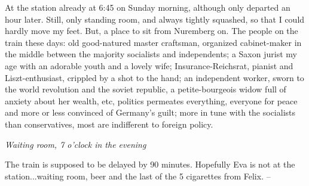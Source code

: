 At the station already at 6:45 on Sunday morning, although only departed an hour later. Still, only standing room, and always tightly squashed, so that I could hardly move my feet. But, a place to sit from Nuremberg on. The people on the train these days: old good-natured master craftsman, organized cabinet-maker in the middle between the majority socialists and independents; a Saxon jurist my age with an adorable youth and a lovely wife; Insurance-Reichsrat, pianist and Liszt-enthusiast, crippled by a shot to the hand; an independent worker, sworn to the world revolution and the soviet republic, a petite-bourgeois widow full of anxiety about her wealth, etc, politics permeates everything, everyone for peace and more or less convinced of Germany's guilt; more in tune with the socialists than conservatives, most are indifferent to foreign policy.

\textit{Waiting room, 7 o'clock in the evening}

The train is supposed to be delayed by 90 minutes. Hopefully Eva is not at the station...waiting room, beer and the last of the 5 cigarettes from Felix. --

